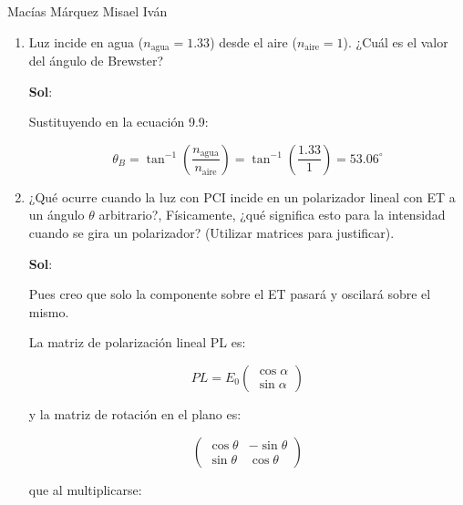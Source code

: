 \documentclass[12pt,a4paper]{article}
\begin{document}
Macías Márquez Misael Iván

\begin{enumerate}





\item Luz incide en agua ($n_{\text{agua}}=1.33$) desde el aire ($n_{\text{aire}}=1$). ¿Cuál es el valor del ángulo de Brewster?

\textbf{Sol}:

Sustituyendo en la ecuación 9.9:

\begin{equation*}
    \theta_B = \tan^{-1}{\left(\frac{n_{\text{agua}}}{n_{\text{aire}}}\right)} = \tan^{-1}{\left(\frac{1.33}{1}\right)} = 53.06 ^{\circ}
\end{equation*}







\item ¿Qué ocurre cuando la luz con PCI incide en un polarizador lineal con ET a un ángulo $\theta$ arbitrario?, Físicamente, ¿qué significa esto para la intensidad cuando se gira un polarizador? (Utilizar matrices para justificar).

\textbf{Sol}:

Pues creo que solo la componente sobre el ET pasará y oscilará sobre el mismo.

La matriz de polarización lineal PL es:

\begin{equation*}
    PL=E_0 \left(\begin{array}{cc}
         \cos{\alpha}  \\
         \sin{\alpha} 
    \end{array}\right)
\end{equation*}

y la matriz de rotación en el plano es:

\begin{equation*}
    \left(\begin{array}{cc}
         \cos{\theta} & -\sin{\theta}  \\
         \sin{\theta} & \cos{\theta}
    \end{array}\right)
\end{equation*}

que al multiplicarse:


\end{enumerate}
\end{document}
